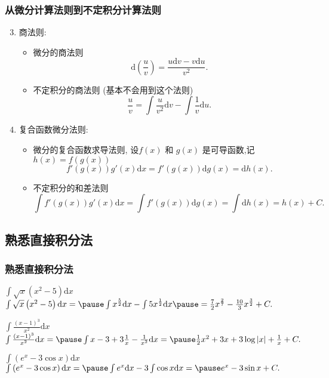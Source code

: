\documentclass[
10pt,
aspectratio=43,
]{beamer}
\begin{document}
\begin{frame}
	\frametitle{从微分计算法则到不定积分计算法则}
	\begin{block}{}
		\begin{enumerate}\setcounter{enumi}{2}
			\pause \item 商法则:
			      \begin{itemize}
				      \pause \item 微分的商法则
				            $$
					            \mathrm{d}\left(\frac{u}{v}\right)=\frac{u\mathrm{d}v-v\mathrm{d}u}{v^2}.
				            $$
				            \pause \item 不定积分的商法则 \pause (基本不会用到这个法则)
				            $$
					            \frac{u}{v}=\int \frac{u}{v^2}\mathrm{d}v-\int\frac{1}{v}\mathrm{d}u.
				            $$

			      \end{itemize}
			      \pause \item 复合函数微分法则:
			      \begin{itemize}
				      \pause\item 微分的复合函数求导法则, 设$f(x)$ 和 $g(x)$ 是可导函数,记 $h(x) = f(g(x))$
				            $$
					            f'(g(x))g'(x)\mathrm{d}x=f'(g(x))\mathrm{d}g(x)=\mathrm{d}h(x).
				            $$
				      \item \pause 不定积分的和差法则
				            $$
					            \int f'(g(x))g'(x)\mathrm{d}x=\int f'(g(x))\mathrm{d}g(x)=\int \mathrm{d}h(x)= h(x)+C.
				            $$
			      \end{itemize}
		\end{enumerate}
	\end{block}
\end{frame}

\subsection{熟悉直接积分法}
\begin{frame}
	\frametitle{熟悉直接积分法}
	\everymath{\displaystyle}
	{\small
		\begin{exampleblock}{$\int \sqrt{x}\left(x^2-5\right) \mathrm{d} x$}
			$
				\int \sqrt{x}\left(x^2-5\right) \mathrm{d}x= \pause \int x^{\frac{5}{2}}\mathrm{d}x-\int 5x^{\frac{1}{2}} \mathrm{d}x \pause =\frac{7}{2}x^{\frac{2}{7}}-\frac{10}{3}x^{\frac{3}{2}}+C.
			$
		\end{exampleblock}
		\pause
		\begin{exampleblock}{$\int \frac{(x-1)^3}{x^2} \mathrm{d} x$}
			$
				\int \frac{(x-1)^3}{x^2} \mathrm{d} x= \pause \int x-3+3\frac{1}{x}-\frac{1}{x^2} \mathrm{d}x= \pause \frac{1}{2}x^2+3x+3\log|x|+\frac{1}{x}+C.
			$
		\end{exampleblock}
		\pause
		\begin{exampleblock}{$\int\left(e^x-3 \cos x\right) \mathrm{d} x$}
			$
				\int\left(e^x-3 \cos x\right) \mathrm{d} x=\pause\int e^x\mathrm{d} x-3 \int\cos x \mathrm{d} x=\pause e^x-3\sin x+C.
			$
		\end{exampleblock}
	}
\end{frame}
\end{document}
